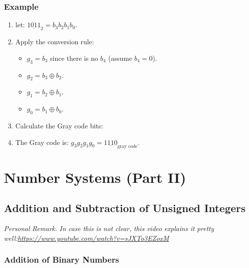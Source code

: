\documentclass[12pt,openany]{book}
\newcommand*\xor{\oplus}
\begin{document}
	\subsection{Example}
	
	\begin{enumerate}
		\item[] let: \(\underline{1011}_{2} = b_3b_2b_1b_0 \).
		\item[] Apply the conversion rule:
		      \begin{itemize}
		      	\item[] \( g_3 = b_3 \) since there is no \( b_4 \) (assume \( b_4 = 0 \)).
		      	\item[] \( g_2 = b_3 \xor b_2 \).
		      	\item[] \( g_1 = b_2 \xor b_1 \).
		      	\item[] \( g_0 = b_1 \xor b_0 \).
		      \end{itemize}
		\item[] Calculate the Gray code bits:
		\item[] The Gray code is: \( g_3g_2g_1g_0 = \underline{1110}_{\text{gray code}} \).
	\end{enumerate}
	
	
	\chapter{Number Systems (Part II)}
	
	\section{Addition and Subtraction
	of Unsigned Integers}
	\textit{Personal Remark. In case this is not clear, this video explains it pretty well:\newline \url{https://www.youtube.com/watch?v=sJXTo3EZoxM}}
	\subsection{Addition of Binary Numbers}
	
\end{document}
